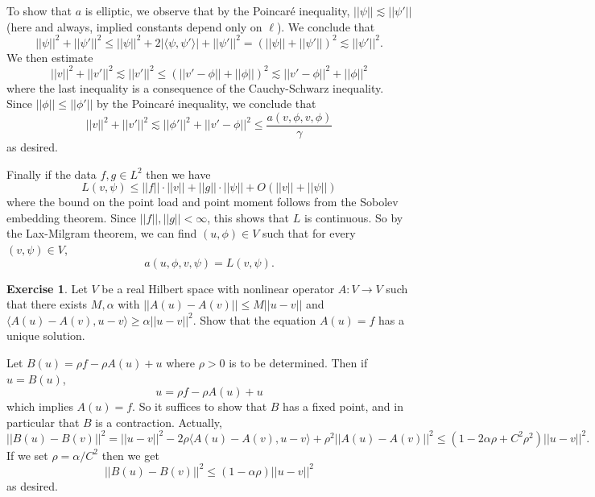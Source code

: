\documentclass[10pt]{article}
\theoremstyle{definition}
\newtheorem{exer}{Exercise}
\begin{document}
To show that $a$ is elliptic, we observe that by the Poincar\'e inequality, $||\psi|| \lesssim ||\psi'||$ (here and always, implied constants depend only on $\ell$).
We conclude that
$$||\psi||^2 + ||\psi'||^2 \leq ||\psi||^2 + 2|\langle \psi, \psi'\rangle| + ||\psi'||^2 = (||\psi|| + ||\psi'||)^2 \lesssim ||\psi'||^2.$$
We then estimate 
$$||v||^2 + ||v'||^2 \lesssim ||v'||^2 \leq (||v' - \phi|| + ||\phi||)^2 \lesssim ||v' - \phi||^2 + ||\phi||^2$$
where the last inequality is a consequence of the Cauchy-Schwarz inequality. Since $||\phi|| \leq ||\phi'||$ by the Poincar\'e inequality, we conclude that 
$$||v||^2 + ||v'||^2 \lesssim ||\phi'||^2 + ||v' - \phi||^2 \leq \frac{a(v, \phi, v, \phi)}{\gamma}$$
as desired.

Finally if the data $f, g \in L^2$ then we have 
$$L(v, \psi) \leq ||f|| \cdot ||v|| + ||g|| \cdot ||\psi|| + O(||v|| + ||\psi||)$$
where the bound on the point load and point moment follows from the Sobolev embedding theorem. Since $||f||, ||g|| < \infty$, this shows that $L$ is continuous. So by the Lax-Milgram theorem, we can find $(u, \phi) \in V$ such that for every $(v, \psi) \in V$,
$$a(u, \phi, v, \psi) = L(v, \psi).$$

\begin{exer}
Let $V$ be a real Hilbert space with nonlinear operator $A: V \to V$ such that there exists $M, \alpha$ with $||A(u) - A(v)|| \leq M||u - v||$ and $\langle A(u) - A(v), u - v\rangle \geq \alpha ||u - v||^2$.
Show that the equation $A(u) = f$ has a unique solution.
\end{exer}

Let $B(u) = \rho f - \rho A(u) + u$ where $\rho > 0$ is to be determined. Then if $u = B(u)$,
$$u = \rho f - \rho A(u) + u$$
which implies $A(u) = f$. So it suffices to show that $B$ has a fixed point, and in particular that $B$ is a contraction.
Actually,
$$||B(u) - B(v)||^2 = ||u - v||^2 - 2\rho\langle A(u) - A(v), u - v\rangle + \rho^2||A(u) - A(v)||^2 \leq (1 - 2\alpha\rho + C^2\rho^2) ||u - v||^2.$$
If we set $\rho = \alpha/C^2$ then we get 
$$||B(u) - B(v)||^2 \leq (1 - \alpha\rho) ||u - v||^2$$
as desired.
\end{document}
